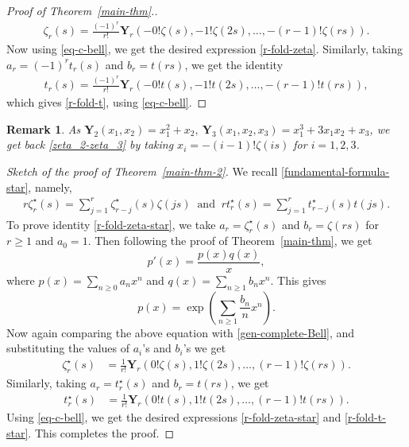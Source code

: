 \documentclass[12pt]{amsart}
\newtheorem{rmk}{Remark}
\newcommand{\thmref}[1]{Theorem~\ref{#1}}
\begin{document}
\begin{proof}[Proof of \thmref{main-thm}.]
\begin{align}\label{eq-zeta}
\zeta_r(s)=\frac{(-1)^r}{r!}\mathbf{Y}_r\left(-0!\zeta(s), -1!\zeta(2s),\ldots,-(r-1)!\zeta(rs)\right).
\end{align}
Now using \eqref{eq-c-bell}, we get the desired expression \eqref{r-fold-zeta}. Similarly, taking $a_r=(-1)^rt_r(s)$ and $b_r=t(rs)$, we get the identity
\begin{align}\label{eq-t-r}
t_r(s)=\frac{(-1)^r}{r!}\mathbf{Y}_r\left(-0!t(s), -1!t(2s), \ldots,-(r-1)!t(rs)\right),
\end{align}
which gives \eqref{r-fold-t}, using \eqref{eq-c-bell}.
\end{proof}


\begin{rmk}\label{rmk-zeta-r}\rm
As $ \mathbf{Y}_2(x_1,x_2)=x_1^2+x_2, \ \mathbf{Y}_3(x_1,x_2,x_3)=x_1^3+3x_1x_2+x_3$, we get back \eqref{zeta_2-zeta_3} by taking $x_i=-(i-1)!\zeta(is)$ for $i=1, 2, 3$.
\end{rmk}



\begin{proof}[Sketch of the proof of \thmref{main-thm-2}] We recall \eqref{fundamental-formula-star}, namely,
\begin{align*}
r\zeta^{\star}_r(s)=\sum_{j=1}^{r}\zeta^{\star}_{r-j}(s)\zeta(js) \ \text{ and } \ rt^{\star}_r(s)=\sum_{j=1}^{r}t^{\star}_{r-j}(s)t(js).
\end{align*}
To prove identity \eqref{r-fold-zeta-star}, we take $a_r= \zeta^{\star}_{r}(s)$ and $b_r=\zeta(rs)$ for $r\geq 1$ and $a_0=1$. Then following the proof of \thmref{main-thm}, we get 
$$
p'(x)=\frac{p(x)q(x)}{x},
$$
where $p(x)=\sum_{n\geq 0}a_nx^n$ and $q(x)=\sum_{n\geq 1}b_nx^n$. This gives 
$$
p(x)=\exp\left(\sum_{n\geq 1}\frac{b_n}{n}x^n\right).
$$
Now again comparing the above equation with \eqref{gen-complete-Bell}, and substituting the values of $a_i$'s and $b_i$'s we get
\begin{align}\label{eq-zeta-star}
\zeta^{\star}_r(s)&=\frac{1}{r!}\mathbf{Y}_r\left(0!\zeta(s), 1!\zeta(2s), \ldots,(r-1)!\zeta(rs)\right).
\end{align}
Similarly, taking $a_r=t^{\star}_r(s)$ and $b_r=t(rs)$, we get 
\begin{align}\label{eq-t-star}
t^{\star}_r(s)&=\frac{1}{r!}\mathbf{Y}_r\left(0!t(s), 1!t(2s), \ldots,(r-1)!t(rs)\right).
\end{align}
Using \eqref{eq-c-bell}, we get the desired expressions \eqref{r-fold-zeta-star} and \eqref{r-fold-t-star}. This completes the proof.
\end{proof}
\end{document}
